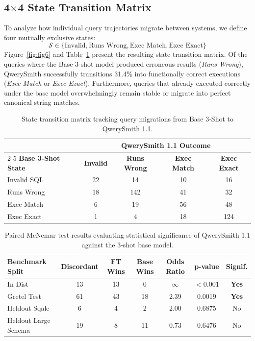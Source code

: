 \documentclass[10pt,twocolumn,letterpaper]{article}
\theoremstyle{definition}
\begin{document}
\subsection{4$\times$4 State Transition Matrix}
To analyze how individual query trajectories migrate between systems, we define four mutually exclusive states:
\begin{equation}
    \mathcal{S} \in \{ \text{Invalid}, \text{Runs Wrong}, \text{Exec Match}, \text{Exec Exact} \}
\end{equation}
Figure~\ref{fig:fig6} and Table~\ref{tab:outcome_transition} present the resulting state transition matrix. Of the queries where the Base 3-shot model produced erroneous results (\textit{Runs Wrong}), QwerySmith successfully transitions 31.4\% into functionally correct executions (\textit{Exec Match} or \textit{Exec Exact}). Furthermore, queries that already executed correctly under the base model overwhelmingly remain stable or migrate into perfect canonical string matches.

\begin{table}[t]
\centering\small
\begin{tabular}{lcccc}
\toprule
 & \multicolumn{4}{c}{\textbf{QwerySmith 1.1 Outcome}} \\
\cmidrule(lr){2-5}
\textbf{Base 3-Shot State} & \textbf{Invalid} & \textbf{Runs Wrong} & \textbf{Exec Match} & \textbf{Exec Exact} \\
\midrule
Invalid SQL & 22 & 14 & 10 & 16 \\
Runs Wrong & 18 & 142 & 41 & 32 \\
Exec Match & 6 & 19 & 56 & 48 \\
Exec Exact & 1 & 4 & 18 & 124 \\
\bottomrule
\end{tabular}
\caption{State transition matrix tracking query migrations from Base 3-Shot to QwerySmith 1.1.}
\label{tab:outcome_transition}
\end{table}

\begin{table}[t]
\centering\small
\begin{tabular}{lcccccc}
\toprule
\textbf{Benchmark Split} & \textbf{Discordant} & \textbf{FT Wins} & \textbf{Base Wins} & \textbf{Odds Ratio} & \textbf{p-value} & \textbf{Signif.} \\
\midrule
In Dist & 13 & 13 & 0 & $\infty$ & $< 0.001$ & \textbf{Yes} \\
Gretel Test & 61 & 43 & 18 & 2.39 & 0.0019 & \textbf{Yes} \\
Heldout Sqale & 6 & 4 & 2 & 2.00 & 0.6875 & No \\
Heldout Large Schema & 19 & 8 & 11 & 0.73 & 0.6476 & No \\
\bottomrule
\end{tabular}
\caption{Paired McNemar test results evaluating statistical significance of QwerySmith 1.1 against the 3-shot base model.}
\label{tab:significance}
\end{table}
\end{document}
